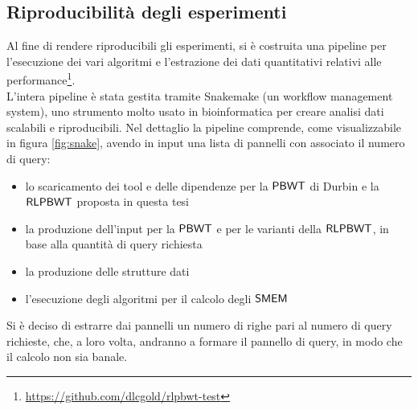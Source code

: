 \subsection{Riproducibilità degli esperimenti}
Al fine di rendere riproducibili gli esperimenti, si è costruita una pipeline
per l'esecuzione dei vari algoritmi e l'estrazione dei dati quantitativi
relativi alle
performance\footnote{\url{https://github.com/dlcgold/rlpbwt-test}}.\\
L'intera pipeline è stata gestita tramite Snakemake \cite{snakemake}
(un workflow management system), uno strumento molto usato in
bioinformatica per creare analisi dati scalabili e riproducibili. Nel
dettaglio la pipeline comprende, come visualizzabile in figura \ref{fig:snake},
avendo in input una lista di pannelli con associato il numero di query:
\begin{itemize}
  \item lo scaricamento dei tool e delle dipendenze per la $\mbox{\rm {\sf PBWT}}$ di
  Durbin e la $\mbox{\rm {\sf RLPBWT}}$ proposta in questa tesi
  \item la produzione dell'input per la $\mbox{\rm {\sf PBWT}}$ e per le varianti della
  $\mbox{\rm {\sf RLPBWT}}$, in base alla quantità di query richiesta
  \item la produzione delle strutture dati
  \item l'esecuzione degli algoritmi per il calcolo degli $\mbox{\rm {\sf SMEM}}$
\end{itemize}
Si è deciso di estrarre dai pannelli un numero di righe pari al numero di 
query richieste, che, a loro volta, andranno a formare il pannello di
query, in modo che il calcolo non sia banale.\\
